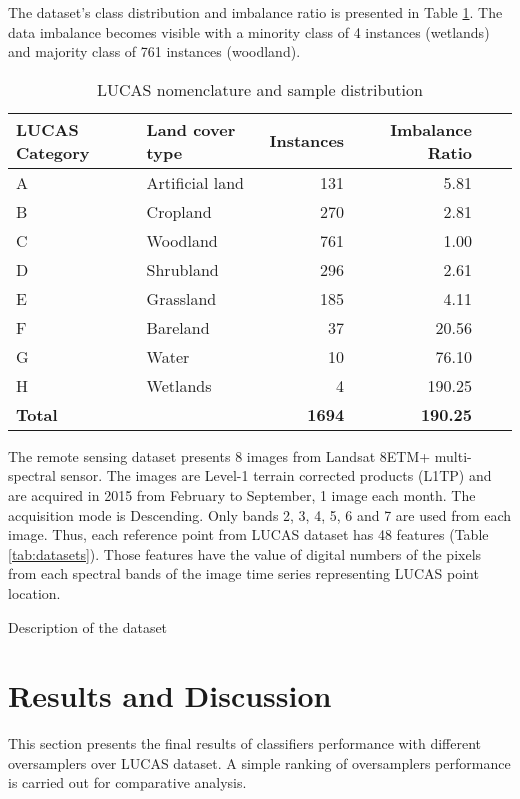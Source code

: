 \documentclass[parskip=full]{scrartcl}
\begin{document}
The dataset's class distribution and imbalance ratio is presented in Table
\ref{tab:dataset_classes}. The data imbalance becomes visible with a minority
class of 4 instances (wetlands) and majority class of 761 instances (woodland).

\begin{table}[H]
	\centering
	\begin{tabular}{llrrrr}
		\toprule
		\textbf{LUCAS Category} & \textbf{Land cover type} & \textbf{Instances}
		& \textbf{Imbalance Ratio} \\
		\hline
		A & Artificial land & 131 & 5.81 \\
		B & Cropland        & 270 & 2.81 \\
		C & Woodland        & 761 & 1.00 \\
		D & Shrubland       & 296 & 2.61 \\
		E & Grassland       & 185 & 4.11 \\
		F & Bareland        & 37  & 20.56 \\
		G & Water           & 10  & 76.10 \\
		H & Wetlands        & 4   & 190.25\\
		\hline
		\textbf{Total} & & \textbf{1694} &  \textbf{190.25} \\
		\bottomrule
	\end{tabular}
	\caption{\label{tab:dataset_classes}LUCAS nomenclature and sample distribution}
\end{table}

The remote sensing dataset presents 8 images from Landsat 8ETM+ multi-spectral
sensor. The images are Level-1 terrain corrected products (L1TP) and are
acquired in 2015 from February to September, 1 image each month. The
acquisition mode is Descending. Only bands 2, 3, 4, 5, 6 and 7 are used from
each image. Thus, each reference point from LUCAS dataset has 48 features
(Table \ref{tab:datasets}). Those features have the value of digital numbers of
the pixels from each spectral bands of the image time series representing LUCAS
point location.

\begin{table}[H]
	\centering
	\caption{\label{tab:datasets}Description of the dataset}
\end{table}

\section{Results and Discussion}
This section presents the final results of classifiers performance with
different oversamplers over LUCAS dataset. A simple ranking of oversamplers
performance is carried out for comparative analysis.
\end{document}
